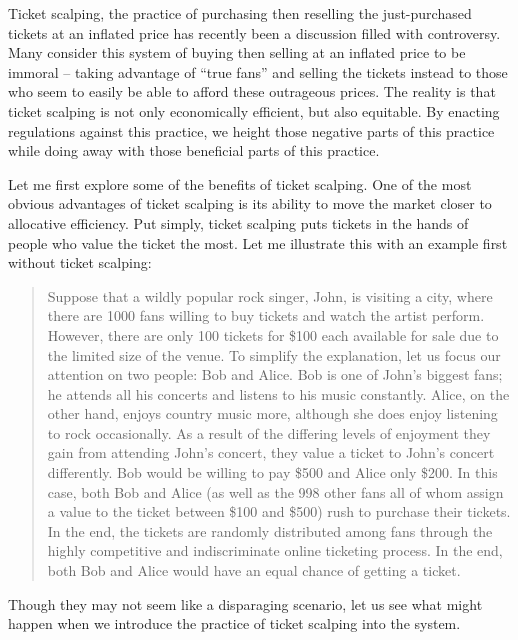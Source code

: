 \documentclass[12pt, a4paper, twoside]{article}
\begin{document}
\maketitle{}

Ticket scalping, the practice of purchasing then reselling the just-purchased tickets at an inflated price has recently been a discussion filled with controversy. Many consider this system of buying then selling at an inflated price to be immoral – taking advantage of “true fans” and selling the tickets instead to those who seem to easily be able to afford these outrageous prices. The reality is that ticket scalping is not only economically efficient, but also equitable. By enacting regulations against this practice, we height those negative parts of this practice while doing away with those beneficial parts of this practice. 

Let me first explore some of the benefits of ticket scalping. One of the most obvious advantages of ticket scalping is its ability to move the market closer to allocative efficiency. Put simply, ticket scalping puts tickets in the hands of people who value the ticket the most. Let me illustrate this with an example first without ticket scalping: 

\begin{quote}
Suppose that a wildly popular rock singer, John, is visiting a city, where there are 1000 fans willing to buy tickets and watch the artist perform. However, there are only 100 tickets for \$100 each available for sale due to the limited size of the venue. To simplify the explanation, let us focus our attention on two people: Bob and Alice. Bob is one of John’s biggest fans; he attends all his concerts and listens to his music constantly. Alice, on the other hand, enjoys country music more, although she does enjoy listening to rock occasionally. As a result of the differing levels of enjoyment they gain from attending John’s concert, they value a ticket to John’s concert differently. Bob would be willing to pay \$500 and Alice only \$200. In this case, both Bob and Alice (as well as the 998 other fans all of whom assign a value to the ticket between \$100 and \$500) rush to purchase their tickets. In the end, the tickets are randomly distributed among fans through the highly competitive and indiscriminate online ticketing process. In the end, both Bob and Alice would have an equal chance of getting a ticket.  
\end{quote}

Though they may not seem like a disparaging scenario, let us see what might happen when we introduce the practice of ticket scalping into the system. 
\end{document}
